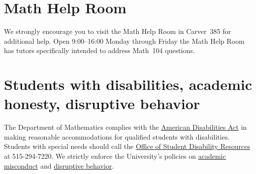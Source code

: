 \documentclass[11pt]{article}
\begin{document}
\section{Math Help Room}\label{MathCenter}
We strongly encourage you to visit the Math Help Room
in Carver~385 for additional help.
Open 9:00--16:00 Monday through Friday the Math Help Room
has tutors specifically intended to address Math~104 questions.

\section{Students with disabilities, academic honesty, disruptive behavior}
The Department of Mathematics complies with the 
\href{http://www.ada.gov}{American Disabilities Act} in making reasonable 
accommodations for qualified students with disabilities.  Students with 
special needs should call the 
\href{http://www.dso.iastate.edu/dr}{Office of Student Disability Resources} at
515-294-7220.
We strictly enforce the University's policies on 
\href{http://www.dso.iastate.edu/ja/academic/misconduct}{academic misconduct}
and \href{http://www.dso.iastate.edu/sa/issuesconcerns/disruption}
{disruptive behavior}.
\end{document}

